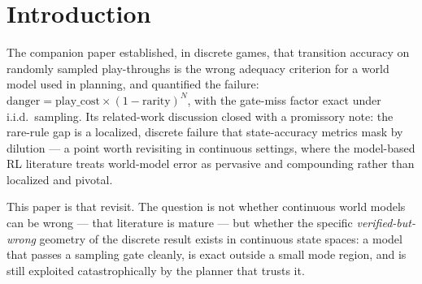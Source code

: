 \documentclass[11pt]{article}
\theoremstyle{definition}
\theoremstyle{remark}
\begin{document}
\begin{abstract}
premise lifted and found not to matter: because the mode freezes the mover at its previous position, no rollout occupies the region's interior, so the transitions a sample can contain are entries into the region and nothing else. We prove the consequence: a rule that agrees with the truth on the reachable set is exactly consistent with every sample, at every sample size and every tolerance, and is harmless at play for the same reason, its disagreement region having query-hit probability zero. Whether the evidence identifies the rule --- relative to a stated hypothesis class and tolerance --- is then a property of the instrument, measurable before any synthesis --- on the disc it does relative to an explicit class and tolerance, on a slab unbounded in one coordinate it does not --- and on the latter the larger model reliably writes such a rule: nineteen of its twenty artifacts pass the acceptance test, an independent acceptance test at the same tolerance, and the paper's own mode probe, without encoding the region. The practical consequence is that a sampling acceptance test leaves the sample's coverage of the mode boundaries uncontrolled, not the gate's tolerance: where the gate is provably informative it covers about two percent of the exploited planner's queries.
\end{abstract}

\section{Introduction}
\label{sec:intro}

The companion paper \citep{aguilar2026verified} established, in discrete games, that transition accuracy on randomly sampled play-throughs is the wrong adequacy criterion for a world model used in planning, and quantified the failure: $\mathrm{danger} = \mathrm{play\_cost} \times (1-\mathrm{rarity})^N$, with the gate-miss factor exact under i.i.d.\ sampling. Its related-work discussion closed with a promissory note: the rare-rule gap is a localized, discrete failure that state-accuracy metrics mask by dilution --- a point worth revisiting in continuous settings, where the model-based RL literature \citep{lambert2020objective,hafner2020dreamer,janner2019mbpo} treats world-model error as pervasive and compounding rather than localized and pivotal.

This paper is that revisit. The question is not whether continuous world models can be wrong --- that literature is mature --- but whether the specific \emph{verified-but-wrong} geometry of the discrete result exists in continuous state spaces: a model that passes a sampling gate cleanly, is exact outside a small mode region, and is still exploited catastrophically by the planner that trusts it.
\end{document}
